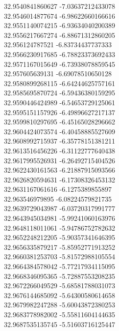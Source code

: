 {32.9540841860627	-7.03637212433078\\
32.9546014877674	-6.98622660166616\\
32.9551140074215	-6.93634040200389\\
32.9556217667274	-6.88671312860205\\
32.956124787521	-6.83734437737333\\
32.9566230917685	-6.78823373692433\\
32.9571167015649	-6.73938078859545\\
32.957605639131	-6.69078510650128\\
32.9580899268115	-6.64244625757161\\
32.9585695870724	-6.59436380159295\\
32.9590446424989	-6.54653729125061\\
32.9595151157926	-6.49896627217137\\
32.9599810297695	-6.45165028296662\\
32.9604424073574	-6.40458885527609\\
32.9608992715937	-6.35778151381211\\
32.9613516456226	-6.31122777640438\\
32.9617995526931	-6.26492715404526\\
32.9622430161563	-6.21887915093566\\
32.9626820594631	-6.17308326453132\\
32.9631167061616	-6.1275389855897\\
32.963546979895	-6.08224579821735\\
32.9639729043987	-6.03720317991777\\
32.9643945034981	-5.99241060163976\\
32.9648118011061	-5.94786752782632\\
32.9652248212205	-5.90357341646395\\
32.9656335879217	-5.85952771913252\\
32.9660381253703	-5.81572988105554\\
32.9664384578042	-5.77217934115095\\
32.9668346095365	-5.72887553208235\\
32.9672266049529	-5.68581788031073\\
32.9676144685092	-5.64300580614658\\
32.9679982247288	-5.60043872380253\\
32.9683778982002	-5.55811604144635\\
32.9687535135745	-5.51603716125447\\
}
